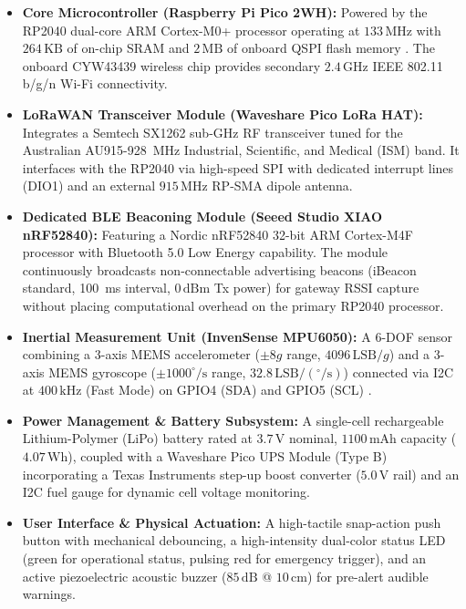 \begin{itemize}
    \item \textbf{Core Microcontroller (Raspberry Pi Pico 2WH):} Powered by the RP2040 dual-core ARM Cortex-M0+ processor operating at $133\,\text{MHz}$ with $264\,\text{KB}$ of on-chip SRAM and $2\,\text{MB}$ of onboard QSPI flash memory \cite{rp2040_datasheet}. The onboard CYW43439 wireless chip provides secondary $2.4\,\text{GHz}$ IEEE 802.11 b/g/n Wi-Fi connectivity.
    \item \textbf{LoRaWAN Transceiver Module (Waveshare Pico LoRa HAT):} Integrates a Semtech SX1262 sub-GHz RF transceiver tuned for the Australian AU915-928~MHz Industrial, Scientific, and Medical (ISM) band. It interfaces with the RP2040 via high-speed SPI with dedicated interrupt lines (DIO1) and an external $915\,\text{MHz}$ RP-SMA dipole antenna.
    \item \textbf{Dedicated BLE Beaconing Module (Seeed Studio XIAO nRF52840):} Featuring a Nordic nRF52840 32-bit ARM Cortex-M4F processor with Bluetooth 5.0 Low Energy capability. The module continuously broadcasts non-connectable advertising beacons (iBeacon standard, 100~ms interval, $0\,\text{dBm}$ Tx power) for gateway RSSI capture without placing computational overhead on the primary RP2040 processor.
    \item \textbf{Inertial Measurement Unit (InvenSense MPU6050):} A 6-DOF sensor combining a 3-axis MEMS accelerometer ($\pm 8g$ range, $4096\,\text{LSB}/g$) and a 3-axis MEMS gyroscope ($\pm 1000^\circ/\text{s}$ range, $32.8\,\text{LSB}/(^\circ/\text{s})$) connected via I2C at $400\,\text{kHz}$ (Fast Mode) on GPIO4 (SDA) and GPIO5 (SCL) \cite{inven_mpu6050}.
    \item \textbf{Power Management \& Battery Subsystem:} A single-cell rechargeable Lithium-Polymer (LiPo) battery rated at $3.7\,\text{V}$ nominal, $1100\,\text{mAh}$ capacity ($4.07\,\text{Wh}$), coupled with a Waveshare Pico UPS Module (Type B) incorporating a Texas Instruments step-up boost converter ($5.0\,\text{V}$ rail) and an I2C fuel gauge for dynamic cell voltage monitoring.
    \item \textbf{User Interface \& Physical Actuation:} A high-tactile snap-action push button with mechanical debouncing, a high-intensity dual-color status LED (green for operational status, pulsing red for emergency trigger), and an active piezoelectric acoustic buzzer ($85\,\text{dB}$ @ $10\,\text{cm}$) for pre-alert audible warnings.
\end{itemize}

